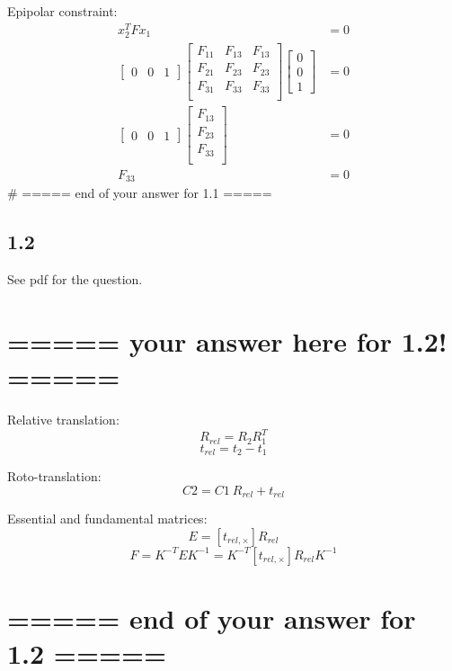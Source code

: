 \documentclass[11pt]{article}
\begin{document}
Epipolar constraint: \[\begin{align*}x^T_2 F x_1 &= 0 \\ 
    \begin{bmatrix} 0 & 0 & 1 \end{bmatrix}
    \begin{bmatrix} F_{11} & F_{13} & F_{13} \\
                    F_{21} & F_{23} & F_{23} \\ 
                    F_{31} & F_{33} & F_{33} \\\end{bmatrix}
    \begin{bmatrix} 0 \\ 0 \\ 1 \end{bmatrix} &= 0 \\
    \begin{bmatrix} 0 & 0 & 1 \end{bmatrix}
    \begin{bmatrix} F_{13} \\
                    F_{23} \\ 
                    F_{33} \\\end{bmatrix} &= 0 \\
                    F_{33} &= 0
\end{align*}\] \# ===== end of your answer for 1.1 =====

    \hypertarget{section}{%
\subsection{1.2}\label{section}}

See pdf for the question.

    \hypertarget{your-answer-here-for-1.2}{%
\section{===== your answer here for 1.2!
=====}\label{your-answer-here-for-1.2}}

Relative translation: \[R_{rel} = R_{2}R_{1}^{T}\]
\[t_{rel} = t_2 - t_1\]

Roto-translation: \[C2 = C1\ R_{rel} + t_{rel}\]

Essential and fundamental matrices: \[E = [t_{rel,\times}]R_{rel}\]
\[F = K^{-T}EK^{-1} = K^{-T}[t_{rel,\times}]R_{rel}K^{-1}\]

\hypertarget{end-of-your-answer-for-1.2}{%
\section{===== end of your answer for 1.2
=====}\label{end-of-your-answer-for-1.2}}
\end{document}
